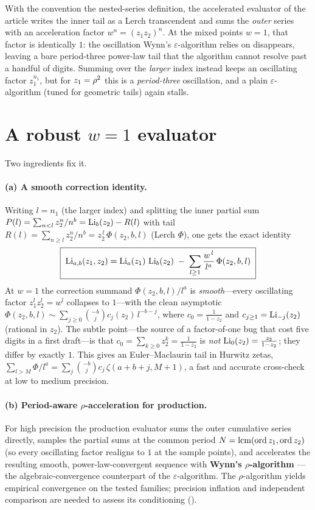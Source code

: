 With the convention the nested-series definition, the accelerated evaluator of the article writes the inner tail as
a Lerch transcendent and sums the \emph{outer} series with an acceleration factor $w^n=(z_1z_2)^n$. At
the mixed points $w=1$, that factor is identically $1$: the oscillation Wynn's $\varepsilon$-algorithm
relies on disappears, leaving a bare period-three power-law tail that the algorithm cannot resolve past
a handful of digits. Summing over the \emph{larger} index instead keeps an oscillating factor
$z_1^{n_1}$, but for $z_1=\rho^2$ this is a \emph{period-three} oscillation, and a plain
$\varepsilon$-algorithm (tuned for geometric tails) again stalls.

\section{A robust \texorpdfstring{$w=1$}{w=1} evaluator}\label{mixed:sec:eval}

Two ingredients fix it.

\paragraph{(a) A smooth correction identity.} Writing $l=n_1$ (the larger index) and splitting the
inner partial sum $P(l)=\sum_{n<l}z_2^n/n^b=\operatorname{Li}_b(z_2)-R(l)$ with tail
$R(l)=\sum_{n\ge l}z_2^n/n^b=z_2^{\,l}\,\Phi(z_2,b,l)$ (Lerch $\Phi$), one gets the exact identity
\begin{equation}\label{mixed:eq:smooth}
  \boxed{\;\operatorname{Li}_{a,b}(z_1,z_2)=\operatorname{Li}_a(z_1)\,\operatorname{Li}_b(z_2)\;-\;\sum_{l\ge1}\frac{w^{\,l}}{l^{a}}\,\Phi(z_2,b,l)\;}
\end{equation}
At $w=1$ the correction summand $\Phi(z_2,b,l)/l^a$ is \emph{smooth}---every oscillating factor
$z_1^l z_2^l=w^l$ collapses to $1$---with the clean asymptotic
$\Phi(z_2,b,l)\sim\sum_{j\ge0}\binom{-b}{j}c_j(z_2)\,l^{-b-j}$, where $c_0=\tfrac1{1-z_2}$ and
$c_{j\ge1}=\operatorname{Li}_{-j}(z_2)$ (rational in $z_2$). The subtle point---the source of a factor-of-one bug
that cost five digits in a first draft---is that $c_0=\sum_{k\ge0}z_2^k=\tfrac1{1-z_2}$ is \emph{not}
$\operatorname{Li}_0(z_2)=\tfrac{z_2}{1-z_2}$; they differ by exactly $1$. This gives an Euler--Maclaurin tail in
Hurwitz zetas, $\sum_{l>M}\Phi/l^a=\sum_j\binom{-b}{j}c_j\,\zeta(a+b+j,M+1)$, a fast and accurate
cross-check at low to medium precision.

\paragraph{(b) Period-aware $\rho$-acceleration for production.} For high precision the production
evaluator sums the outer cumulative series directly, samples the partial sums at the common period
$N=\operatorname{lcm}(\operatorname{ord} z_1,\operatorname{ord} z_2)$ (so every oscillating factor realigns to $1$ at the sample points), and
accelerates the resulting smooth, power-law-convergent sequence with \textbf{Wynn's $\rho$-algorithm}
---the algebraic-convergence counterpart of the $\varepsilon$-algorithm. The $\rho$-algorithm yields
empirical convergence on the tested families; precision inflation and independent comparison are needed to assess its conditioning
().

